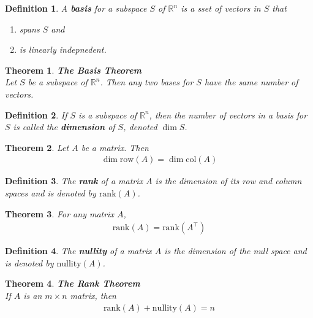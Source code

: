 \documentclass{article}
\theoremstyle{sltheorem}
\newtheorem{definition}{Definition}[section]
\newtheorem{theorem}{Theorem}[section]
\begin{document}
\begin{definition}
    A \textbf{basis} for a subspace $S$ of $\mathbb{R}^n$ is a sset of vectors in $S$ that
    \begin{enumerate}
        \item spans $S$ and
        \item is linearly indepnedent.
    \end{enumerate}
\end{definition}
\begin{theorem}
    \textbf{The Basis Theorem}\\
    Let $S$ be a subspace of $\mathbb{R}^n$. Then any two bases for $S$ have the same number of vectors.
\end{theorem}
\begin{definition}
    If $S$ is a subspace of $\mathbb{R}^n$, then the number of vectors in a basis for $S$ is called the \textbf{dimension} of $S$, denoted $\dim S$.
\end{definition}
\begin{theorem}
    Let $A$ be a matrix. Then
    \begin{gather*}
        \dim \text{row}(A) = \dim \text{col}(A)
    \end{gather*}
\end{theorem}
\begin{definition}
    The \textbf{rank} of a matrix $A$ is the dimension of its row and column spaces and is denoted by $\text{rank}(A)$.
\end{definition}
\begin{theorem}
    For any matrix $A$,
    \begin{gather*}
        \text{rank}(A) = \text{rank}(A^\intercal)
    \end{gather*}
\end{theorem}
\begin{definition}
    The \textbf{nullity} of a matrix $A$ is the dimension of the null space and is denoted by $\text{nullity}(A)$.
\end{definition}
\begin{theorem}
    \textbf{The Rank Theorem}\\
    If $A$ is an $m\times n$ matrix, then
    \begin{gather*}
        \text{rank}(A) + \text{nullity}(A) = n
    \end{gather*}
\end{theorem}
\end{document}
